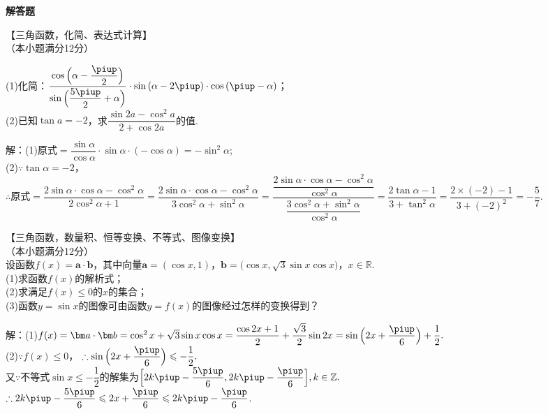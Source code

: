   \begin{exercise}{\bf 解答题}
    \item 【三角函数，化简、表达式计算】\\
      （本小题满分12分）\par
      (1)化简：$\dfrac{\cos{\Bigl(\alpha-\dfrac{\piup}2\Bigr)}}{\sin{\Bigl(\dfrac{5\piup}2+\alpha\Bigr)}}\cdot\sin{(\alpha-2\piup)}\cdot\cos{(\piup-\alpha)}$；\\
      (2)已知$\tan{a}=-2$，求$\dfrac{\sin{2a}-\cos^2{a}}{2+\cos{2a}}$的值.
      \begin{answer}
      解：(1)$\text{原式}=\dfrac{\sin\alpha}{\cos\alpha}\cdot\sin\alpha\cdot(-\cos\alpha)=-\sin^2\alpha$;\\
      (2)$\because\tan\alpha=-2$，
      $\therefore\text{原式}=\dfrac{2\sin\alpha\cdot\cos\alpha-\cos^2\alpha}{2\cos^2\alpha+1}
      =\dfrac{2\sin\alpha\cdot\cos\alpha-\cos^2\alpha}{3\cos^2\alpha+\sin^2\alpha}
      =\dfrac{\dfrac{2\sin\alpha\cdot\cos\alpha-\cos^2\alpha}{\cos^2\alpha}}{\dfrac{3\cos^2\alpha+\sin^2\alpha}{\cos^2\alpha}}
      =\dfrac{2\tan\alpha-1}{3+\tan^2\alpha}=\dfrac{2\times(-2)-1}{3+(-2)^2}
      =-\dfrac{5}{7}.$
      \end{answer}
    \item 【三角函数，数量积、恒等变换、不等式、图像变换】\\
      （本小题满分12分）\\
      设函数$f(x)=\bm a\cdot\bm b$，其中向量$\bm a=(\cos x,1)$，$\bm b=\bigl(\cos x,\sqrt3\sin x\cos x\bigr)$，$x\in\mathbb{R}$.\\
      (1)求函数$f(x)$的解析式；\\
      (2)求满足$f(x)\leqslant0$的$x$的集合；\\
      (3)函数$y=\sin x$的图像可由函数$y=f(x)$的图像经过怎样的变换得到？
      \begin{answer}
        解：(1)$f(x)=\bm a\cdot\bm b
        =\cos^2x+\sqrt3\sin x\cos x
        =\dfrac{\cos{2x}+1}2+\dfrac{\sqrt3}{2}\sin{2x}
        =\sin{\Bigl(2x+\dfrac{\piup}6\Bigr)}+\dfrac12.$\\
        (2)$\because f(x)\leqslant0$，
        $\therefore \sin{\Bigl(2x+\dfrac{\piup}6\Bigr)}\leqslant-\dfrac12.$\\
        又$\because$不等式$\sin x\leqslant-\dfrac12$的解集为$\Bigl[2k\piup-\dfrac{5\piup}6,2k\piup-\dfrac{\piup}6\Bigr],k\in\mathbb{Z}.$\\
        $\therefore 2k\piup-\dfrac{5\piup}6 \leqslant 2x+\dfrac{\piup}6 \leqslant 2k\piup-\dfrac{\piup}6$.\\

\end{answer}
\end{exercise}

